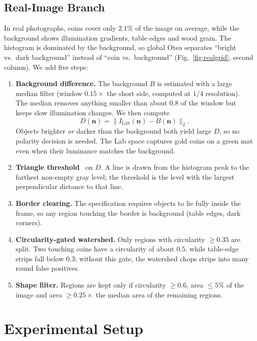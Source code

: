 \documentclass[conference,a4paper]{IEEEtran}
\begin{document}
\subsection{Real-Image Branch}\label{sec:realbranch}
In real photographs, coins cover only $2.1\%$ of the image on average, while the background shows illumination gradients, table edges and wood grain. The histogram is dominated by the background, so global Otsu separates ``bright vs.\ dark background'' instead of ``coin vs.\ background'' (Fig.~\ref{fig:realgrid}, second column). We add five steps:
\begin{enumerate}
\item \textbf{Background difference.} The background $B$ is estimated with a large median filter (window $0.15\times$ the short side, computed at $1/4$ resolution). The median removes anything smaller than about $0.8$ of the window but keeps slow illumination changes. We then compute
\begin{equation}
D(\mathbf{n})=\bigl\lVert I_{\text{Lab}}(\mathbf{n})-B(\mathbf{n})\bigr\rVert_2 .
\label{eq:diff}
\end{equation}
Objects brighter \emph{or} darker than the background both yield large $D$, so no polarity decision is needed. The Lab space captures gold coins on a green mat even when their luminance matches the background.
\item \textbf{Triangle threshold}~\cite{zack1977} on $D$. A line is drawn from the histogram peak to the farthest non-empty gray level; the threshold is the level with the largest perpendicular distance to that line.
\item \textbf{Border clearing.} The specification requires objects to lie fully inside the frame, so any region touching the border is background (table edges, dark corners).
\item \textbf{Circularity-gated watershed.} Only regions with circularity $\ge0.35$ are split. Two touching coins have a circularity of about $0.5$, while table-edge strips fall below $0.3$; without this gate, the watershed chops strips into many round false positives.
\item \textbf{Shape filter.} Regions are kept only if circularity $\ge0.6$, area $\le5\%$ of the image and area $\ge0.25\times$ the median area of the remaining regions.
\end{enumerate}

\section{Experimental Setup}
\end{document}
